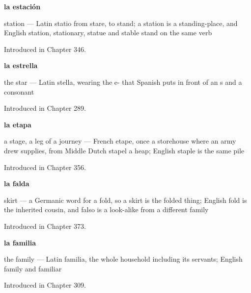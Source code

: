 \noindent\begin{minipage}[t]{\linewidth}
\raggedright
\textbf{la estación}\par
\small station — Latin statio from stare, to stand; a station is a standing-place, and English station, stationary, statue and stable stand on the same verb\par
\footnotesize Introduced in Chapter 346.
\end{minipage}\par\medskip

\noindent\begin{minipage}[t]{\linewidth}
\raggedright
\textbf{la estrella}\par
\small the star — Latin stella, wearing the e- that Spanish puts in front of an s and a consonant\par
\footnotesize Introduced in Chapter 289.
\end{minipage}\par\medskip

\noindent\begin{minipage}[t]{\linewidth}
\raggedright
\textbf{la etapa}\par
\small a stage, a leg of a journey — French etape, once a storehouse where an army drew supplies, from Middle Dutch stapel a heap; English staple is the same pile\par
\footnotesize Introduced in Chapter 356.
\end{minipage}\par\medskip

\noindent\begin{minipage}[t]{\linewidth}
\raggedright
\textbf{la falda}\par
\small skirt — a Germanic word for a fold, so a skirt is the folded thing; English fold is the inherited cousin, and falso is a look-alike from a different family\par
\footnotesize Introduced in Chapter 373.
\end{minipage}\par\medskip

\noindent\begin{minipage}[t]{\linewidth}
\raggedright
\textbf{la familia}\par
\small the family --- Latin familia, the whole household including its servants; English family and familiar\par
\footnotesize Introduced in Chapter 309.
\end{minipage}\par\medskip

